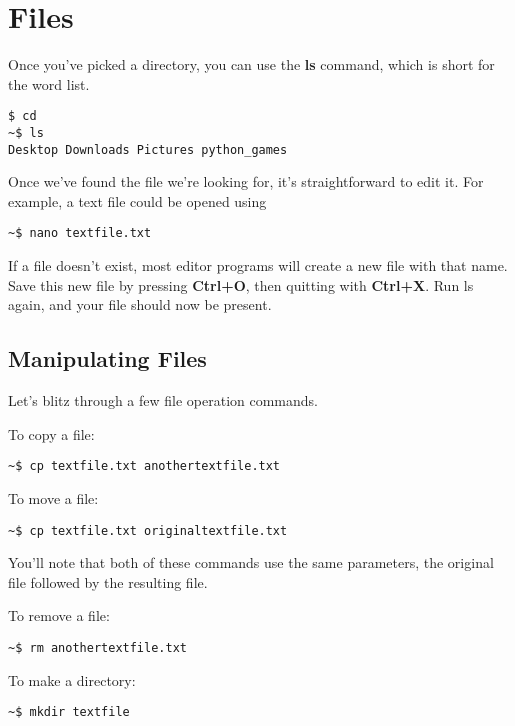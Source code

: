 \section{Files}
	
	Once you've picked a directory, you can use the \textbf{ls} command, which is short for the word list.
	
	\begin{lstlisting}[style=Terminal]
 $ cd
~$ ls
Desktop Downloads Pictures python_games
	\end{lstlisting}

	Once we've found the file we're looking for, it's straightforward to edit it. For example, a text file could be opened using
	
	\begin{lstlisting}[style=Terminal]
~$ nano textfile.txt
	\end{lstlisting}	

	If a file doesn't exist, most editor programs will create a new file with that name. Save this new file by pressing \textbf{Ctrl+O}, then quitting with \textbf{Ctrl+X}. Run ls again, and your file should now be present.

	\subsection{Manipulating Files}
	
		Let's blitz through a few file operation commands.
		
		To copy a file:
		\begin{lstlisting}[style=Terminal]
~$ cp textfile.txt anothertextfile.txt
		\end{lstlisting}

		To move a file:
		\begin{lstlisting}[style=Terminal]
~$ cp textfile.txt originaltextfile.txt
		\end{lstlisting}

		You'll note that both of these commands use the same parameters, the original file followed by the resulting file.

		To remove a file:	
		\begin{lstlisting}[style=Terminal]
~$ rm anothertextfile.txt
		\end{lstlisting}

		To make a directory:		
		\begin{lstlisting}[style=Terminal]
~$ mkdir textfile
		\end{lstlisting}

